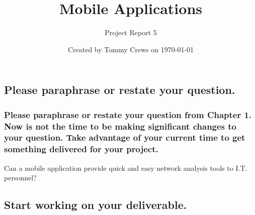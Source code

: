 \documentclass[letterpaper]{article}            %
\title{Mobile Applications}                     %
\author{Project Report 5}                       %
\date{Created by Tommy Crews on \today}         %
\begin{document}
\newcommand{\code}[1]{\texttt{#1}}              %

\setcounter{section}{5}							%

\maketitle                                      %



%
%




\subsection{Please paraphrase or restate your question.}

\subsubsection{Please paraphrase or restate your question from Chapter 1. Now is not the time to be making significant changes to your question. Take advantage of your current time to get something delivered for your project.}

Can a mobile application provide quick and easy network analysis tools to I.T. personnel?


\subsection{Start working on your deliverable.}
\end{document}
